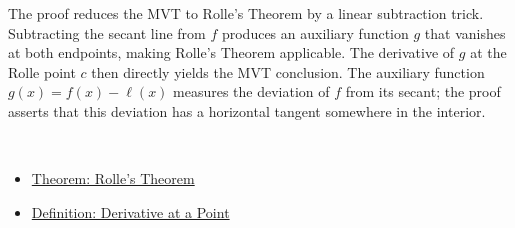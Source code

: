 \begin{remark*}
The proof reduces the MVT to Rolle's Theorem by a linear subtraction trick. Subtracting the secant line from $f$ produces an auxiliary function $g$ that vanishes at both endpoints, making Rolle's Theorem applicable. The derivative of $g$ at the Rolle point $c$ then directly yields the MVT conclusion. The auxiliary function $g(x) = f(x) - \ell(x)$ measures the deviation of $f$ from its secant; the proof asserts that this deviation has a horizontal tangent somewhere in the interior.
\end{remark*}

\begin{remark*}[Dependencies]~\\
\begin{itemize}
  \item \hyperref[thm:rolles-theorem]{Theorem: Rolle's Theorem}
  \item \hyperref[def:derivative-at-a-point]{Definition: Derivative at a Point}
\end{itemize}
\end{remark*}

\clearpage
